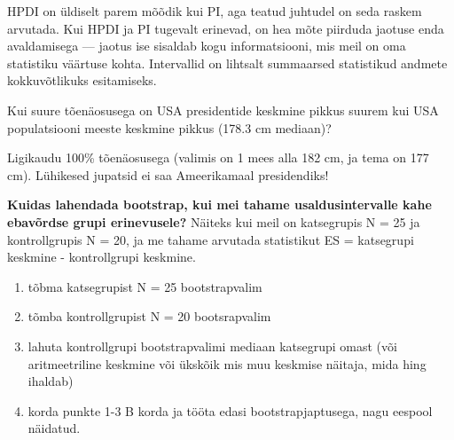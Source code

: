\documentclass[]{book}
\newenvironment{Shaded}{\begin{snugshade}}{\end{snugshade}}
\newcommand{\CommentTok}[1]{\textcolor[rgb]{0.56,0.35,0.01}{\textit{#1}}}
\newcommand{\DataTypeTok}[1]{\textcolor[rgb]{0.13,0.29,0.53}{#1}}
\newcommand{\FloatTok}[1]{\textcolor[rgb]{0.00,0.00,0.81}{#1}}
\newcommand{\KeywordTok}[1]{\textcolor[rgb]{0.13,0.29,0.53}{\textbf{#1}}}
\newcommand{\NormalTok}[1]{#1}
\newcommand{\OperatorTok}[1]{\textcolor[rgb]{0.81,0.36,0.00}{\textbf{#1}}}
\newcommand{\StringTok}[1]{\textcolor[rgb]{0.31,0.60,0.02}{#1}}
\begin{document}
\begin{Shaded}
\end{Shaded}

HPDI on üldiselt parem mõõdik kui PI, aga teatud juhtudel on seda raskem arvutada. Kui HPDI ja PI tugevalt erinevad, on hea mõte piirduda jaotuse enda avaldamisega --- jaotus ise sisaldab kogu informatsiooni, mis meil on oma statistiku väärtuse kohta. Intervallid on lihtsalt summaarsed statistikud andmete kokkuvõtlikuks esitamiseks.

Kui suure tõenäosusega on USA presidentide keskmine pikkus suurem kui USA populatsiooni meeste keskmine pikkus (178.3 cm mediaan)?

\begin{Shaded}
\end{Shaded}

Ligikaudu 100\% tõenäosusega (valimis on 1 mees alla 182 cm, ja tema on 177 cm). Lühikesed jupatsid ei saa Ameerikamaal presidendiks!

\textbf{Kuidas lahendada bootstrap, kui mei tahame usaldusintervalle kahe ebavõrdse grupi erinevusele?} Näiteks kui meil on katsegrupis N = 25 ja kontrollgrupis N = 20, ja me tahame arvutada statistikut ES = katsegrupi keskmine - kontrollgrupi keskmine.

\begin{enumerate}
\def\labelenumi{\arabic{enumi}.}
\item
  tõbma katsegrupist N = 25 bootstrapvalim
\item
  tõmba kontrollgrupist N = 20 bootsrapvalim
\item
  lahuta kontrollgrupi bootstrapvalimi mediaan katsegrupi omast (või aritmeetriline keskmine või ükskõik mis muu keskmise näitaja, mida hing ihaldab)
\item
  korda punkte 1-3 B korda ja tööta edasi bootstrapjaptusega, nagu eespool näidatud.
\end{enumerate}
\end{document}
